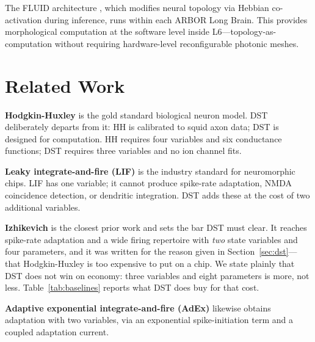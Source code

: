\documentclass[12pt]{article}
\begin{document}
The FLUID architecture \cite{lin2026fluid}, which modifies neural topology via Hebbian co-activation during inference, runs within each ARBOR Long Brain. This provides morphological computation at the software level inside L6---topology-as-computation without requiring hardware-level reconfigurable photonic meshes.

\section{Related Work}
\label{sec:related}

\textbf{Hodgkin-Huxley} \cite{hodgkin1952} is the gold standard biological neuron model. DST deliberately departs from it: HH is calibrated to squid axon data; DST is designed for computation. HH requires four variables and six conductance functions; DST requires three variables and no ion channel fits.

\textbf{Leaky integrate-and-fire (LIF)} \cite{lapicque1907} is the industry standard for neuromorphic chips. LIF has one variable; it cannot produce spike-rate adaptation, NMDA coincidence detection, or dendritic integration. DST adds these at the cost of two additional variables.

\textbf{Izhikevich} \cite{izhikevich2003,izhikevich2004} is the closest prior work and sets the bar DST must clear. It reaches spike-rate adaptation and a wide firing repertoire with \textit{two} state variables and four parameters, and it was written for the reason given in Section~\ref{sec:dst}---that Hodgkin-Huxley is too expensive to put on a chip. We state plainly that DST does not win on economy: three variables and eight parameters is more, not less. Table~\ref{tab:baselines} reports what DST does buy for that cost.

\textbf{Adaptive exponential integrate-and-fire (AdEx)} \cite{brette2005} likewise obtains adaptation with two variables, via an exponential spike-initiation term and a coupled adaptation current.
\end{document}
